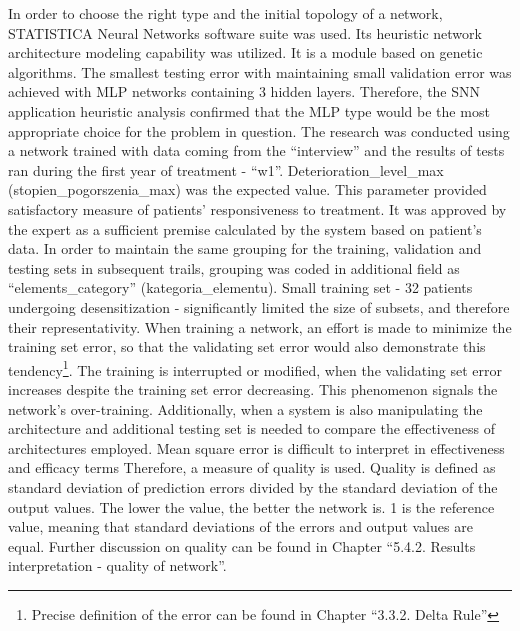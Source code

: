 \documentclass[10pt,oneside]{memoir}
\begin{document}
In order to choose the right type and the initial topology of a network, STATISTICA Neural Networks software suite was used. Its heuristic network architecture modeling capability was utilized. It is a module based on genetic algorithms. The smallest testing error with maintaining small validation error was achieved with MLP networks containing 3 hidden layers. Therefore, the SNN application heuristic analysis confirmed that the MLP type would be the most appropriate choice for the problem in question.
The research was conducted using a network trained with data coming from the ``interview'' and the results of tests ran during the first year of treatment - ``w1''. Deterioration\_level\_max (stopien\_pogorszenia\_max) was the expected value. This parameter provided satisfactory measure of patients' responsiveness to treatment. It was approved by the expert as a sufficient premise calculated by the system based on patient's data.
In order to maintain the same grouping for the training, validation and testing sets in subsequent trails, grouping was coded in additional field as ``elements\_category'' (kategoria\_elementu). Small training set - 32 patients undergoing desensitization - significantly limited the size of subsets, and therefore their representativity.
When training a network, an effort is made to minimize the training set error, so that the validating set error would also demonstrate this tendency\footnote{Precise definition of the error can be found in Chapter ``3.3.2. Delta Rule''}. The training is interrupted or modified, when the validating set error increases despite the training set error decreasing. This phenomenon signals the network's over-training. Additionally, when a system is also manipulating the architecture and additional testing set is needed to compare the effectiveness of architectures employed.
Mean square error is difficult to interpret in effectiveness and efficacy terms Therefore, a measure of quality is used.
Quality is defined as standard deviation of prediction errors divided by the standard deviation of the output values. The lower the value, the better the network is. 1 is the reference value, meaning that standard deviations of the errors and output values are equal. Further discussion on quality can be found in Chapter ``5.4.2. Results interpretation - quality of network''.
\end{document}
